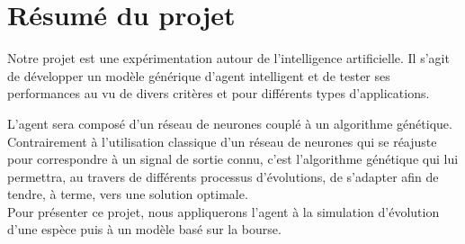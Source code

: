 \chapter{Résumé du projet}


Notre projet est une expérimentation autour de l'intelligence artificielle. Il s'agit de développer un modèle générique d'agent intelligent et de tester ses performances au vu de divers critères et pour différents types d'applications.

L'agent sera composé d'un réseau de neurones couplé à un algorithme génétique. Contrairement à l'utilisation classique d'un réseau de neurones qui se réajuste pour correspondre à un signal de sortie connu, c'est l'algorithme génétique qui lui permettra, au travers de différents processus d'évolutions, de s'adapter afin de tendre, à terme, vers une solution optimale.\\


Pour présenter ce projet, nous appliquerons l'agent à la simulation d'évolution d'une espèce puis à un modèle basé sur la bourse.


\clearpage
